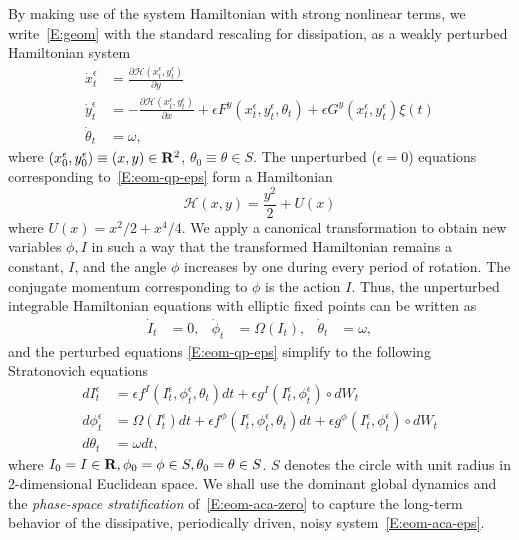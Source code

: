 By making use of the system Hamiltonian with strong nonlinear terms, we write~\eqref{E:geom} with the standard rescaling for dissipation, as a weakly perturbed Hamiltonian system
\begin{equation}
\begin{aligned}
\dot x_t^\epsilon &= \frac{\partial {\mathcal H}(x_t^\epsilon,y_t^\epsilon)}{\partial y}\\
\dot y_t^\epsilon &= -\frac{\partial {\mathcal H}(x_t^\epsilon,y_t^\epsilon)}{\partial x} + \epsilon F^y (x_t^\epsilon, y_t^\epsilon, \theta_t) + \epsilon G^y(x_t^\epsilon, y_t^\epsilon) \xi(t)\\
\dot \theta_t &= \omega,
\end{aligned}
\label{E:eom-qp-eps}
\end{equation}
where $(x_0^\epsilon, y_0^\epsilon)\equiv(x,y) \in \mathbf R^2$, $\theta_0 \equiv \theta \in S$. The unperturbed ($\epsilon = 0$) equations corresponding to~\eqref{E:eom-qp-eps} form a Hamiltonian
\[
\mathcal H (x,y) = \frac{y^2}{2} + U (x)
\]
where $U(x) = x^2/2+x^4/4$. We apply a canonical transformation to obtain new variables $\phi, I$ in such a way that the transformed Hamiltonian remains a constant, $I$, and the angle $\phi$ increases by one during every period of rotation. The conjugate momentum corresponding to $\phi$ is the action $I$. Thus, the unperturbed integrable Hamiltonian equations with elliptic fixed points can be written as
\begin{align}
\dot I_t &= 0, & \dot \phi_t &= \Omega (I_t), & \dot \theta_t &= \omega,
\label{E:eom-aca-zero}
\end{align}
and the perturbed equations \eqref{E:eom-qp-eps} simplify to the following Stratonovich equations
\begin{equation}\begin{aligned}
d I_t^\epsilon &= \epsilon f^I(I_t^\epsilon, \phi_t^\epsilon, \theta_t) dt + \epsilon g^I (I_t^\epsilon, \phi_t^\epsilon) \circ dW_t\\
d \phi_t^\epsilon &= \Omega(I_t^\epsilon) dt + \epsilon f^\phi (I_t^\epsilon, \phi_t^\epsilon, \theta_t) dt+ \epsilon g^\phi (I_t^\epsilon, \phi_t^\epsilon) \circ dW_t\\
d \theta_t &= \omega d t,
\end{aligned}\label{E:eom-aca-eps}
\end{equation}
where $I_0=I \in \mathbf R, \phi_0 = \phi \in S, \theta_0=\theta \in S$. $S$ denotes the circle with unit radius in 2-dimensional Euclidean space. We shall use the dominant global dynamics and the \emph{phase-space stratification} of~\eqref{E:eom-aca-zero} to capture the long-term behavior of the dissipative, periodically driven, noisy system~\eqref{E:eom-aca-eps}.

